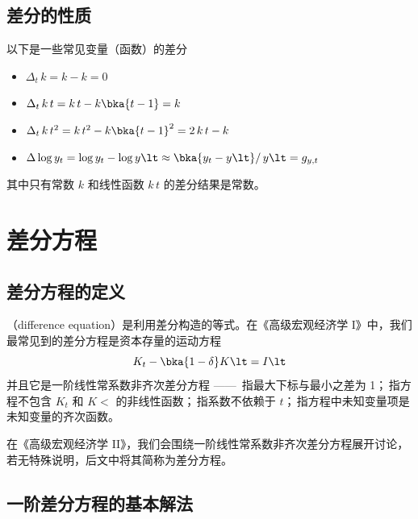 \subsection{差分的性质}\label{subsec:DiffProp}

以下是一些常见变量（函数）的差分
\begin{itemize}
    \item \(\Delta_t\, k = k-k=0\)
    \item \(\Delta_t\, k\,t = k\,t-k\bka{t-1}=k\)
    \item \(\Delta_t\, k\,t^2=k\,t^2-k\bka{t-1}^2=2\,k\,t-k\)
    \item \(\Delta\log y_t=\log y_t-\log y\lt\approx\bka{y_t-y\lt}/\,y\lt=g_{y,t}\)
\end{itemize}
其中只有常数 \(k\) 和线性函数 \(k\,t\) 的差分结果是常数。


\section{差分方程}\label{sec:DiffEqu}

\subsection{差分方程的定义}\label{subsec:DiffEquDef}

（difference equation）是利用差分构造的等式。在《高级宏观经济学 I》中，我们最常见到的差分方程是资本存量的运动方程
\begin{equation}
    K_t - \bka{1-\delta} K\lt = I\lt\notag
\end{equation}
并且它是一阶线性常系数非齐次差分方程 —— \,指最大下标与最小之差为 1；\,指方程不包含 \(K_t\) 和 \(K\lt\) 的非线性函数；\,指系数不依赖于 \(t\)；\,指方程中未知变量项是未知变量的齐次函数。

在《高级宏观经济学 II》，我们会围绕一阶线性常系数非齐次差分方程展开讨论，若无特殊说明，后文中将其简称为差分方程。

\subsection{一阶差分方程的基本解法}\label{sec:DiffEquBasicSoln}

